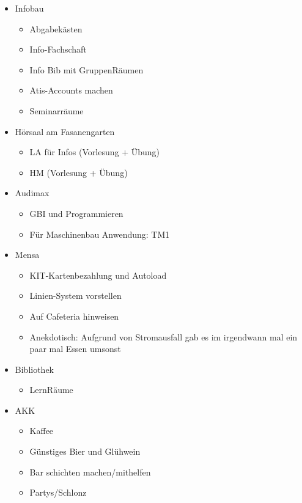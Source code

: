 \documentclass[10pt,ngerman]{scrartcl}
\begin{document}
\begin{multicols}{2}
\begin{itemize}
    \item Infobau
        \begin{itemize}
            \item Abgabekästen
            \item Info-Fachschaft
            \item Info Bib mit GruppenRäumen
            \item Atis-Accounts machen
            \item Seminarräume
        \end{itemize}
    \item Hörsaal am Fasanengarten
        \begin{itemize}
            \item LA für Infos (Vorlesung + Übung)
            \item HM (Vorlesung + Übung)
        \end{itemize}
    \item Audimax
        \begin{itemize}
            \item GBI und Programmieren
            \item Für Maschinenbau Anwendung: TM1
        \end{itemize}
    \item Mensa
        \begin{itemize}
            \item KIT-Kartenbezahlung und Autoload
            \item Linien-System vorstellen
            \item Auf Cafeteria hinweisen
            \item Anekdotisch: Aufgrund von Stromausfall gab es im irgendwann mal ein paar mal Essen umsonst
        \end{itemize}
    \item Bibliothek
        \begin{itemize}
            \item LernRäume
        \end{itemize}
    \item AKK
        \begin{itemize}
            \item Kaffee
            \item Günstiges Bier und Glühwein
            \item Bar schichten machen/mithelfen
            \item Partys/Schlonz

\end{itemize}
\end{itemize}
\end{multicols}
\end{document}
